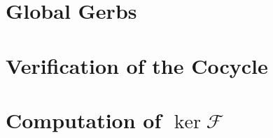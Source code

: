 \documentclass{amsart}
\numberwithin{equation}{section}
\begin{document}
% 

\section{Global Gerbs} \label{sec:global}


\printbibliography[title={References}]

\newpage
\appendix
\section{Verification of the Cocycle} \label{sec:verifycocycle}


\section{Computation of \texorpdfstring{$\ker\mathcal F$}{ker F}} \label{sec:havegensproof}

\end{document}
